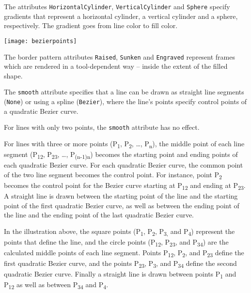 The attributes \lstinline!HorizontalCylinder!, \lstinline!VerticalCylinder! and \lstinline!Sphere! specify
gradients that represent a horizontal cylinder, a vertical cylinder and
a sphere, respectively. The gradient goes from line color to fill color.

\texttt{[image: bezierpoints]}

The border pattern attributes \lstinline!Raised!, \lstinline!Sunken! and \lstinline!Engraved! represent frames
which are rendered in a tool-dependent way -- inside the extent of the
filled shape.

The \lstinline!smooth! attribute specifies that a line can be drawn as straight line
segments (\lstinline!None!) or using a spline (\lstinline!Bezier!), where the line's points
specify control points of a quadratic Bezier curve.

For lines with only two points, the \lstinline!smooth! attribute has no effect.

For lines with three or more points (P\textsubscript{1},
P\textsubscript{2}, \ldots{}, P\textsubscript{n}), the middle point of
each line segment (P\textsubscript{12}, P\textsubscript{23}, \ldots{},
P\textsubscript{(n-1)n}) becomes the starting point and ending points of
each quadratic Bezier curve. For each quadratic Bezier curve, the common
point of the two line segment becomes the control point. For instance,
point P\textsubscript{2} becomes the control point for the Bezier curve
starting at P\textsubscript{12} and ending at P\textsubscript{23}. A
straight line is drawn between the starting point of the line and the
starting point of the first quadratic Bezier curve, as well as between
the ending point of the line and the ending point of the last quadratic
Bezier curve.

In the illustration above, the square points (P\textsubscript{1},
P\textsubscript{2}, P\textsubscript{3,} and P\textsubscript{4})
represent the points that define the line, and the circle points
(P\textsubscript{12}, P\textsubscript{23}, and P\textsubscript{34}) are
the calculated middle points of each line segment. Points
P\textsubscript{12}, P\textsubscript{2}, and P\textsubscript{23} define
the first quadratic Bezier curve, and the points P\textsubscript{23},
P\textsubscript{3}, and P\textsubscript{34} define the second quadratic
Bezier curve. Finally a straight line is drawn between points
P\textsubscript{1} and P\textsubscript{12} as well as between
P\textsubscript{34} and P\textsubscript{4}.

